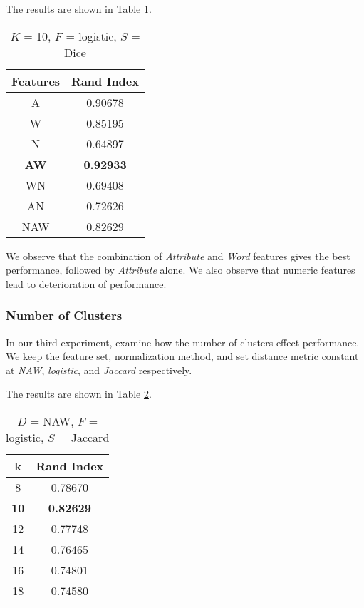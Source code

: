 \documentclass{article}
\begin{document}
         The results are shown in Table \ref{tab:feature}.
         \begin{table}
            \begin{center}
               \begin{tabular}{| c | c |}
                  \hline
                     Features & Rand Index \\
                  \hline
                     A & 0.90678 \\
                     W & 0.85195 \\
                     N & 0.64897 \\
                     \textbf{AW} & \textbf{0.92933}\\
                     WN & 0.69408 \\
                     AN & 0.72626 \\
                     NAW & 0.82629 \\
                  \hline
               \end{tabular}
               \caption{$K$ = 10, $F$ = logistic, $S$ = Dice}
               \label{tab:feature}
            \end{center}
         \end{table}

         We observe that the combination of \textit{Attribute} and \textit{Word} features gives the best performance, followed by \textit{Attribute} alone.
         We also observe that numeric features lead to deterioration of performance.

      \subsubsection{Number of Clusters}
         In our third experiment, examine how the number of clusters effect performance.
         We keep the feature set, normalization method, and set distance metric constant at \textit{NAW}, \textit{logistic}, and \textit{Jaccard} respectively.

         The results are shown in Table \ref{tab:cluster}. 
         \begin{table}
            \begin{center}
               \begin{tabular}{| c | c |}
                  \hline
                     k & Rand Index \\
                  \hline
                     8 & 0.78670 \\
                     \textbf{10} & \textbf{0.82629} \\
                     12 & 0.77748 \\
                     14 & 0.76465\\
                     16 & 0.74801 \\
                     18 & 0.74580 \\
                  \hline
               \end{tabular}
               \caption{$D$ = NAW, $F$ = logistic, $S$ = Jaccard}
               \label{tab:cluster}
            \end{center}
         \end{table}
\end{document}
